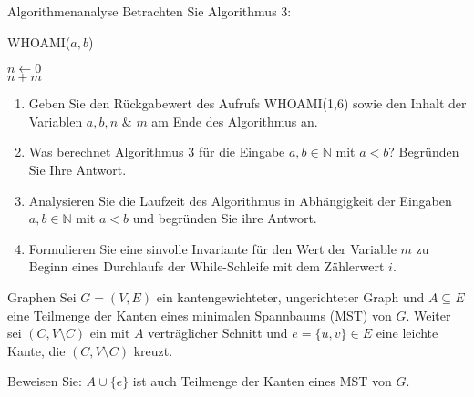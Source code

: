 \documentclass{article}
\begin{document}
\begin{exercise}{Algorithmenanalyse}
  Betrachten Sie Algorithmus 3:
  \begin{algorithm}[ht]
    \caption{WHOAMI($a, b$)}
    $n \gets 0$ \\
    \Return $n + m$
  \end{algorithm}
  \begin{enumerate}
    \item Geben Sie den Rückgabewert des Aufrufs WHOAMI(1,6) sowie den Inhalt der Variablen $a, b, n$ \& $m$ am Ende des Algorithmus an.
    \item Was berechnet Algorithmus 3 für die Eingabe $a, b \in \mathbb{N}$ mit $a < b$? Begründen Sie Ihre Antwort.
    \item Analysieren Sie die Laufzeit des Algorithmus in Abhängigkeit der Eingaben $a, b \in \mathbb{N}$ mit $a < b$ und begründen Sie ihre Antwort.
    \item Formulieren Sie eine sinvolle Invariante für den Wert der Variable $m$ zu Beginn eines Durchlaufs der While-Schleife mit dem Zählerwert $i$.
  \end{enumerate}
\end{exercise}

\begin{exercise}{Graphen}
  Sei $G = (V, E)$ ein kantengewichteter, ungerichteter Graph und $A \subseteq E$ eine Teilmenge der Kanten eines minimalen Spannbaums (MST) von $G$. Weiter sei $(C, V \setminus C)$ ein mit $A$ verträglicher Schnitt und $e = \{u, v\} \in E$ eine leichte Kante, die $(C, V \setminus C)$ kreuzt.\par
  Beweisen Sie: $A \cup \{e\}$ ist auch Teilmenge der Kanten eines MST von $G$.
\end{exercise}
\end{document}
